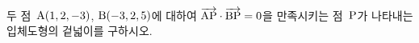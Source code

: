 두 점~$\mathrm{A}(1{,}\mkern3mu\mathopen{}2{,}\mkern3mu\mathopen{}-3)$, $\mathrm{B}(-3{,}\mkern3mu\mathopen{}2{,}\mkern3mu\mathopen{}5)$에 대하여 $\overrightarrow{\mathrm{AP}}\cdot\overrightarrow{\mathrm{BP}}=0$을 만족시키는 점~$\mathrm{P}$가 나타내는 입체도형의 겉넓이를 구하시오.

